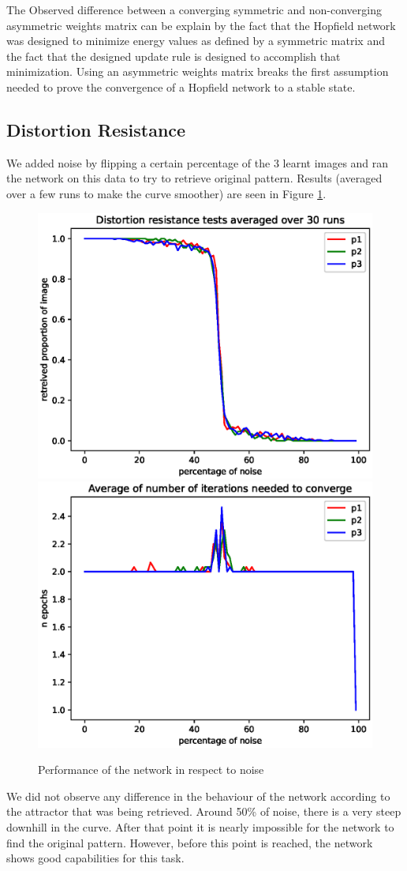 \documentclass[a4paper]{article}
\begin{document}
The Observed difference between a converging symmetric and non-converging asymmetric weights matrix can be explain by the fact that the Hopfield network was designed to minimize energy values as defined by a symmetric matrix and the fact that the designed update rule is designed to accomplish that minimization. Using an asymmetric weights matrix breaks the first assumption needed to prove the convergence of a Hopfield network to a stable state.

\subsection{Distortion Resistance}

We added noise by flipping a certain percentage of the 3 learnt images and ran the network on this data to try to retrieve original pattern. Results (averaged over a few runs to make the curve smoother) are seen in Figure \ref{fig:dist_res}.

\begin{figure}[h]
    \centering
    \includegraphics[width=.49\linewidth]{img/noise_distortion_01.eps}
    \includegraphics[width=.49\linewidth]{img/noise_distortion_02.eps}
    \caption{Performance of the network in respect to noise}
    \label{fig:dist_res}
\end{figure}

We did not observe any difference in the behaviour of the network according to the attractor that was being retrieved. Around 50\% of noise, there is a very steep downhill in the curve. After that point it is nearly impossible for the network to find the original pattern. However, before this point is reached, the network shows good capabilities for this task.
\end{document}
